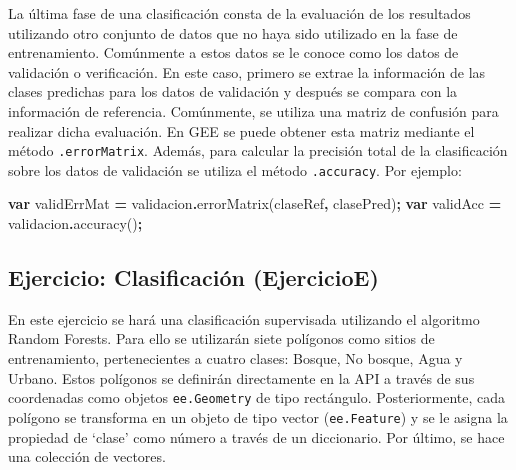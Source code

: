 \documentclass[
  12pt,
  letterpaper,
  twoside]{book}
\newenvironment{Shaded}{\begin{snugshade}}{\end{snugshade}}
\newcommand{\FunctionTok}[1]{\textcolor[rgb]{0.00,0.00,0.00}{#1}}
\newcommand{\KeywordTok}[1]{\textcolor[rgb]{0.13,0.29,0.53}{\textbf{#1}}}
\newcommand{\NormalTok}[1]{#1}
\newcommand{\OperatorTok}[1]{\textcolor[rgb]{0.81,0.36,0.00}{\textbf{#1}}}
\newcommand{\StringTok}[1]{\textcolor[rgb]{0.31,0.60,0.02}{#1}}
\begin{document}
La última fase de una clasificación consta de la evaluación de los resultados utilizando otro conjunto de datos que no haya sido utilizado en la fase de entrenamiento. Comúnmente a estos datos se le conoce como los datos de validación o verificación. En este caso, primero se extrae la información de las clases predichas para los datos de validación y después se compara con la información de referencia. Comúnmente, se utiliza una matriz de confusión para realizar dicha evaluación. En GEE se puede obtener esta matriz mediante el método \texttt{.errorMatrix}. Además, para calcular la precisión total de la clasificación sobre los datos de validación se utiliza el método \texttt{.accuracy}. Por ejemplo:

\begin{Shaded}
\begin{Highlighting}[]
\KeywordTok{var}\NormalTok{ validErrMat }\OperatorTok{=}\NormalTok{ validacion}\OperatorTok{.}\FunctionTok{errorMatrix}\NormalTok{(}\StringTok{\textquotesingle{}claseRef\textquotesingle{}}\OperatorTok{,} \StringTok{\textquotesingle{}clasePred\textquotesingle{}}\NormalTok{)}\OperatorTok{;}
\KeywordTok{var}\NormalTok{ validAcc }\OperatorTok{=}\NormalTok{ validacion}\OperatorTok{.}\FunctionTok{accuracy}\NormalTok{()}\OperatorTok{;}
\end{Highlighting}
\end{Shaded}

\hypertarget{ejercicio-clasificaciuxf3n-ejercicioe}{%
\subsection{Ejercicio: Clasificación (EjercicioE)}\label{ejercicio-clasificaciuxf3n-ejercicioe}}

En este ejercicio se hará una clasificación supervisada utilizando el algoritmo Random Forests. Para ello se utilizarán siete polígonos como sitios de entrenamiento, pertenecientes a cuatro clases: Bosque, No bosque, Agua y Urbano. Estos polígonos se definirán directamente en la API a través de sus coordenadas como objetos \texttt{ee.Geometry} de tipo rectángulo. Posteriormente, cada polígono se transforma en un objeto de tipo vector (\texttt{ee.Feature}) y se le asigna la propiedad de `clase' como número a través de un diccionario. Por último, se hace una colección de vectores.
\end{document}
